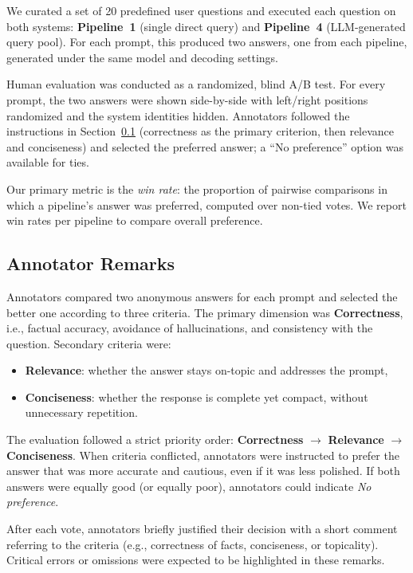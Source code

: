 \documentclass[manuscript,screen]{acmart}
\begin{document}
\begin{CCSXML}
	We curated a set of 20 predefined user questions and executed each question on
	both systems: \textbf{Pipeline~1} (single direct query) and \textbf{Pipeline~4}
	(LLM-generated query pool). For each prompt, this produced two answers, one from
	each pipeline, generated under the same model and decoding settings.
	
	Human evaluation was conducted as a randomized, blind A/B test. For every
	prompt, the two answers were shown side-by-side with left/right positions
	randomized and the system identities hidden. Annotators followed the instructions
	in Section~\ref{subsec:annotator-remarks} (correctness as the primary criterion,
	then relevance and conciseness) and selected the preferred answer; a “No
	preference” option was available for ties.
	
	Our primary metric is the \emph{win rate}: the proportion of pairwise
	comparisons in which a pipeline’s answer was preferred, computed over
	non-tied votes. We report win rates per pipeline to compare overall preference.
	
	\subsection{Annotator Remarks}
	\label{subsec:annotator-remarks}
	
	Annotators compared two anonymous answers for each prompt and selected the
	better one according to three criteria. The primary dimension was
	\textbf{Correctness}, i.e., factual accuracy, avoidance of hallucinations, and
	consistency with the question. Secondary criteria were:
	
	\begin{itemize}
	  \item \textbf{Relevance}: whether the answer stays on-topic and addresses the prompt,
	  \item \textbf{Conciseness}: whether the response is complete yet compact, without unnecessary repetition.
	\end{itemize}
	
	The evaluation followed a strict priority order:
	\textbf{Correctness} $\rightarrow$ \textbf{Relevance} $\rightarrow$
	\textbf{Conciseness}. When criteria conflicted, annotators were instructed to
	prefer the answer that was more accurate and cautious, even if it was less
	polished. If both answers were equally good (or equally poor), annotators could
	indicate \emph{No preference}.
	
	After each vote, annotators briefly justified their decision with a short
	comment referring to the criteria (e.g., correctness of facts, conciseness, or
	topicality). Critical errors or omissions were expected to be highlighted in
	these remarks.
	

\end{CCSXML}
\end{document}
